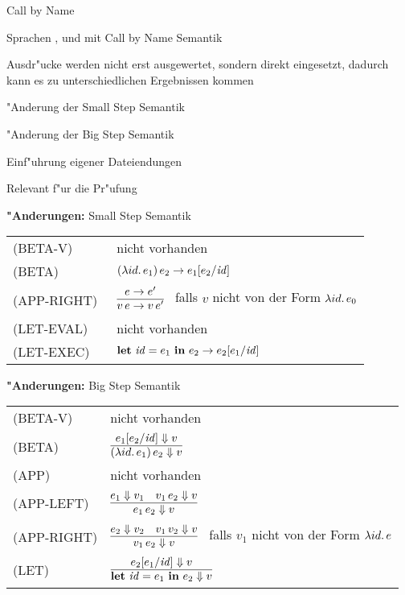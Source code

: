 {
  \begin{itemgroup}{Call by Name}
    \item Sprachen \LZEROCBN, \LONECBN und \LTWOCBN  mit Call by Name Semantik
    \item Ausdr"ucke werden nicht erst ausgewertet, sondern direkt eingesetzt,
          dadurch kann es zu unterschiedlichen Ergebnissen kommen
    \item "Anderung der Small Step Semantik
    \item "Anderung der Big Step Semantik
    \item Einf"uhrung eigener Dateiendungen
    \item Relevant f"ur die Pr"ufung \glqq \TPONE \grqq
  \end{itemgroup}
}


{
  {\bf "Anderungen:} Small Step Semantik\\[5mm]
  \begin{tabular}{ll}
     \mbox{(BETA-V)}      & nicht vorhanden \\[3mm]
     \mbox{(BETA)}        & $(\lambda id.\,e_1)\,e_2 \to e_1[e_2/{\text{\it id\/}}]$ \\[3mm]
     \mbox{(APP-RIGHT)\ } & $\regel{e \to e'}
                                   {v\,e \to v\,e'}$ \ 
                                   falls ${v}$ nicht von der Form $\lambda id.\,e_0$ \\[5mm]
     \mbox{(LET-EVAL)\  } & nicht vorhanden \\[3mm]
     \mbox{(LET-EXEC)}    & $\textbf{let}\ {\text{\it id\/}} = e_1\ \textbf{in}\ e_2 \to e_2[e_1/{\text{\it id\/}}]$ \\[3mm]
  \end{tabular}
}


{
  {\bf "Anderungen:} Big Step Semantik\\[5mm]
  \begin{tabular}{ll}
     \mbox{(BETA-V)}      & nicht vorhanden \\[3mm]
     \mbox{(BETA)}        & $\regel{e_1[e_2/\id] \eval v}
                                   {(\abstr{id}{e_1})\,e_2 \eval v}$ \\[5mm]
     \mbox{(APP)}         & nicht vorhanden \\[3mm]
     \mbox{(APP-LEFT)}    & $\regel{e_1 \eval v_1 \quad v_1\,e_2 \eval v}
                                   {e_1\,e_2 \eval v}$ \\[5mm]
     \mbox{(APP-RIGHT)}   & $\regel{e_2 \eval v_2 \quad v_1\,v_2 \eval v}
                                   {v_1\,e_2 \eval v}$ \ 
                                   falls ${v_1}$ nicht von der Form $\lambda id.\,e$ \\[5mm]
     \mbox{(LET)}         & $\regel{e_2[e_1/\id] \eval v}
                                   {\bli{\id}{e_1}{e_2} \eval v}$ \\[5mm]
  \end{tabular}
}


